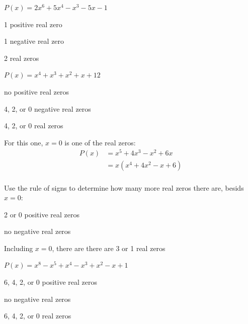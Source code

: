 \documentclass{exam}
\begin{document}
\begin{description}
      \pagebreak

      \item[61]
        $P(x) = 2x^6 + 5x^4 - x^3 - 5x - 1$
        \begin{itemize*}
          \item 1 positive real zero
          \item 1 negative real zero
          \item 2 real zeros
        \end{itemize*}
        
      \item[62]
        $P(x) = x^4 + x^3 + x^2 + x + 12$

        \begin{itemize*}
          \item no positive real zeros
          \item 4, 2, or 0 negative real zeros
          \item 4, 2, or 0 real zeros
        \end{itemize*}
          
      \item[63]
        For this one, $x = 0$ is one of the real zeros:
        \begin{align*}
          P(x) &= x^5 + 4x^3 - x^2 + 6x \\
               &= x(x^4 + 4x^2 - x + 6) \\
        \end{align*}

        Use the rule of signs to determine how many more real zeros there are, besids $x = 0$:
        \begin{itemize*}
          \item 2 or 0 positive real zeros
          \item no negative real zeros
          \item Including $x = 0$, there are there are 3 or 1 real zeros
        \end{itemize*}
          
      \item[64]
        $P(x) = x^8 - x^5 + x^4 - x^3 + x^2 - x + 1$

        \begin{itemize*}
          \item 6, 4, 2, or 0 positive real zeros
          \item no negative real zeros
          \item 6, 4, 2, or 0 real zeros
        \end{itemize*}


\end{description}
\end{document}
